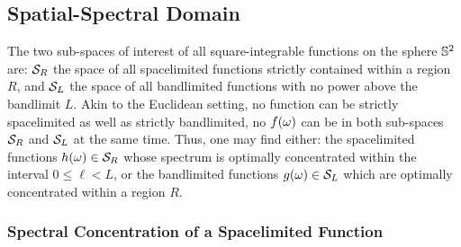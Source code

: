 \subsection{Spatial-Spectral Domain}\label{sec:chapter2_slepian_sphere}

The two sub-spaces of interest of all square-integrable functions on the sphere \(\mathbb{S}^{2}{}\) are: \(\mathcal{S}_{R}{}\) the space of all spacelimited functions strictly contained within a region \(R\), and \(\mathcal{S}_{L}{}\) the space of all bandlimited functions with no power above the bandlimit \(L\).
Akin to the Euclidean setting, no function can be strictly spacelimited as well as strictly bandlimited, \ie{} no \(f(\omega)\) can be in both sub-spaces \(\mathcal{S}_{R}{}\) and \(\mathcal{S}_{L}{}\) at the same time.
Thus, one may find either: the spacelimited functions \(h(\omega) \in \mathcal{S}_{R}{}\) whose spectrum is optimally concentrated within the interval \(0 \leq \ell < L\), or the bandlimited functions \(g(\omega) \in \mathcal{S}_{L}{}\) which are optimally concentrated within a region \(R\).

\subsubsection{Spectral Concentration of a Spacelimited Function}

